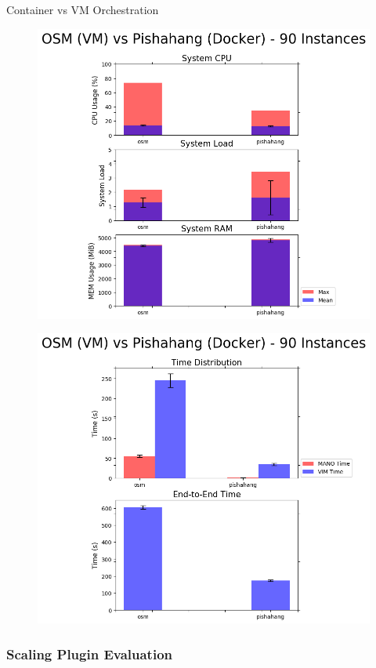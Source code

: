 Container vs VM Orchestration

\begin{figure}[h]
	\centering
	\includegraphics[width=0.7\linewidth]{figures/scalability_graphs/Comparison-VM-Docker/System_metrics_comparison}
	\caption{}
	\label{fig:systemmetricscomparison}
\end{figure}

\begin{figure}[h]
	\centering
	\includegraphics[width=0.7\linewidth]{figures/scalability_graphs/Comparison-VM-Docker/Time_comparison}
	\caption{}
	\label{fig:timecomparison}
\end{figure}


\subsubsection{Scaling Plugin Evaluation}

